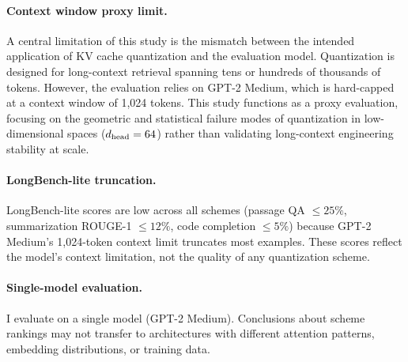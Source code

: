 \paragraph{Context window proxy limit.}
A central limitation of this study is the mismatch between the intended application of KV cache quantization and the evaluation model. Quantization is designed for long-context retrieval spanning tens or hundreds of thousands of tokens. However, the evaluation relies on GPT-2 Medium, which is hard-capped at a context window of 1{,}024 tokens. This study functions as a proxy evaluation, focusing on the geometric and statistical failure modes of quantization in low-dimensional spaces ($d_{\text{head}} = 64$) rather than validating long-context engineering stability at scale.

\paragraph{LongBench-lite truncation.}
LongBench-lite scores are low across all schemes (passage QA
$\leq 25\%$, summarization ROUGE-1 $\leq 12\%$, code completion
$\leq 5\%$) because GPT-2 Medium's 1{,}024-token context limit
truncates most examples.
These scores reflect the model's context limitation, not the quality
of any quantization scheme.

\paragraph{Single-model evaluation.}
I evaluate on a single model (GPT-2 Medium).
Conclusions about scheme rankings may not transfer to architectures with
different attention patterns, embedding distributions, or training data.

